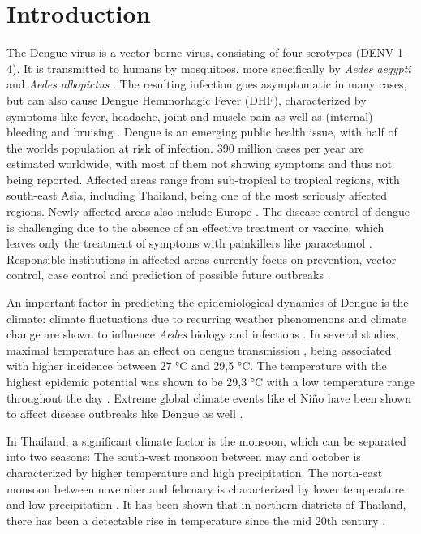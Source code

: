 \newpage
\section{Introduction}\label{sec:introduction}

The Dengue virus is a vector borne virus, consisting of four serotypes (DENV 1-4).  It is transmitted to humans by mosquitoes, more specifically by \emph{Aedes aegypti} and \emph{Aedes albopictus} \citep{Phanitchat.2019}. The resulting infection goes asymptomatic in many cases, but can also cause Dengue Hemmorhagic Fever (DHF), characterized by symptoms like fever, headache, joint and muscle pain as well as (internal) bleeding and bruising \citep{Gubler.1998}.
Dengue is an emerging public health issue, with half of the worlds population at risk of infection. 390 million cases per year are estimated worldwide, with most of them not showing symptoms and thus not being reported. Affected areas range from sub-tropical to tropical regions, with south-east Asia, including Thailand, being one of the most seriously affected regions. Newly affected areas also include Europe \citep{WHO.2023}.
The disease control of dengue is challenging due to the absence of an effective treatment or vaccine, which leaves only the treatment of symptoms with painkillers like paracetamol \citep{WHO.2023}. Responsible institutions in affected areas currently focus on prevention, vector control, case control and prediction of possible future outbreaks \citep{Phanitchat.2019}. 

An important factor in predicting the epidemiological dynamics of Dengue is the climate: climate fluctuations due to recurring weather phenomenons and climate change are shown to influence \emph{Aedes} biology and infections \citep{Descloux2012, Phanitchat.2019}.
In several studies, maximal temperature has an effect on dengue transmission \citep{Descloux2012}, being associated with higher incidence \citep{Phanitchat.2019} between 27 °C and 29,5 °C. The temperature with the highest epidemic potential was shown to be 29,3 °C with a low temperature range throughout the day \citep{Liu2014}. Extreme global climate events like el Niño have been shown to affect disease outbreaks like Dengue as well \citep{Anyamba2019}.

In Thailand, a significant climate factor is the monsoon, which can be separated into two seasons: The south-west monsoon between may and october is characterized by higher temperature and high precipitation. The north-east monsoon between november and february is characterized by lower temperature and low precipitation \citep{Kripalani1995}. It has been shown that in northern districts of Thailand, there has been a detectable rise in temperature since the mid 20th century \citep{Masud2016}.

